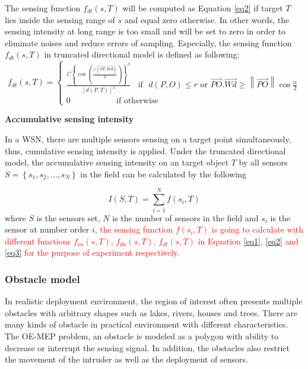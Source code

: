 \documentclass[final]{elsarticle}
\begin{document}
The sensing function $f_{dt}(s,T)$ will be computed as Equation \ref{eq2} if target $T$ lies inside the sensing range of $s$ and equal zero otherwise. In other words, the sensing intensity at long range is too small and will be set to zero in order to eliminate noises and reduce errors of sampling. Especially, the sensing function $f_{dt}(s,T)$ in truncated directional model is defined as following:
\begin{equation}
\label{eq3}
f_{dt}({s},T) = \left\{
\begin{aligned}
 \frac {{C{{\left\{ {\cos \left( {\frac{{\angle (\overrightarrow {PT} ,\overrightarrow {Wd}) }}{2}} \right)} \right\}}}^\beta }} {{{{\left[ {d(P,T)} \right]}^\lambda }}} \:\:\:\:\text{if} \:\:\: d(P,O) \le r \text{ or } \overrightarrow {PO} .\overrightarrow {Wd}  \ge \left\| {\overrightarrow {PO} } \right\|\cos \frac{\alpha}{2} \\
 0 \:\:\:\:\:\:\:\:\:\:\:\:\:\:\:\:\:\:\:\:\:\:\:\:\:\text{if  otherwise}\:\:\:\:\:\:\:\:\:\:\:\:\:\:\:\:\:\:\:\:\:\:\:\:\:\:\:\:\:\:\:\:\:\:\:\:\:\:\:\:\:\:\:\:\:\:\:\:\:\:\:\:\:\:\:\:\:\:
\end{aligned}
\right.
\end{equation}

\noindent\textbf{Accumulative sensing intensity}

In a WSN, there are multiple sensors sensing on a target point simultaneously, thus, cumulative sensing intensity is applied. Under the truncated directional model, the accumulative sensing intensity on an target object $ T $ by all sensors $S = \left\{ {{s_1},{s_2},...,{s_N}} \right\}$ in the field can be calculated by the following

\begin{equation}
\label{eq4}
I(S, T) = \sum\limits_{i = 1}^{N} {f({s_i},T)} 
\end{equation}
where $ S $ is the sensors set, $ N $ is the number of sensors in the field and $s_i$ is the sensor at number order $ i $, \textcolor{red}{the sensing function $ f({s_i},T)$ is going to calculate with different functions $f_{oa}({s},T)$,  $ f_{da}({s},T) $, $f_{dt}({s},T)$ in Equation \eqref{eq1}, \eqref{eq2} and \eqref{eq3} for the purpose of experiment respectively.} 

\subsubsection{Obstacle model}
In realistic deployment environment, the region of interest often presents multiple obstacles with arbitrary shapes such as lakes, rivers, houses and trees. There are many kinds of obstacle in practical environment with different characteristics. The OE-MEP problem, an obstacle is modeled as a polygon with ability to decrease or interrupt the sensing signal. In addition, the obstacles also restrict the movement of the intruder as well as the deployment of sensors. 
\end{document}
